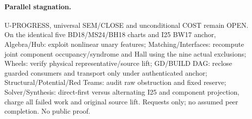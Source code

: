 \documentclass[11pt]{article}
\begin{document}
\paragraph{Parallel stagnation.}
U-PROGRESS, universal SEM/CLOSE and unconditional COST remain OPEN. On the identical five BD18/MS24/BH18 charts and I25 BW17 anchor, Algebra/Hub: exploit nonlinear unary features; Matching/Interfaces: recompute joint component occupancy/syndrome and Hall using the nine actual exclusions; Wheels: verify physical representative/source lift; GD/BUILD DAG: reclose guarded consumers and transport only under authenticated anchor; Structural/Potential/Red Teams: audit raw obstruction and fixed reserve; Solver/Synthesis: direct-first versus alternating I25 and component projection, charge all failed work and original source lift. Requests only; no assumed peer completion. No public proof.
\end{document}
